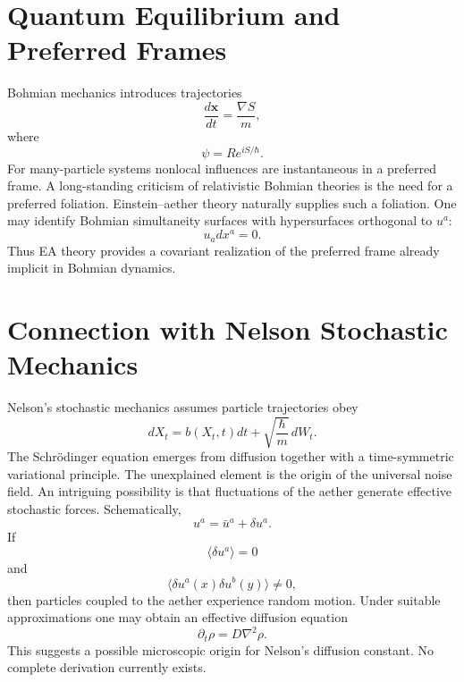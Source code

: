 \documentclass[11pt]{article}
\begin{document}
\section{Quantum Equilibrium and Preferred Frames}
Bohmian mechanics introduces trajectories
\begin{equation}
\frac{d\mathbf{x}}{dt}
=
\frac{\nabla S}{m},
\end{equation}
where
\begin{equation}
\psi=R e^{iS/\hbar}.
\end{equation}
For many-particle systems nonlocal influences are instantaneous in a
preferred frame.
A long-standing criticism of relativistic Bohmian theories is the need
for a preferred foliation.
Einstein--aether theory naturally supplies such a foliation.
One may identify Bohmian simultaneity surfaces with hypersurfaces
orthogonal to $u^a$:
\begin{equation}
u_a dx^a =0.
\end{equation}
Thus EA theory provides a covariant realization of the preferred frame
already implicit in Bohmian dynamics.
\section{Connection with Nelson Stochastic Mechanics}
Nelson's stochastic mechanics assumes particle trajectories obey
\begin{equation}
dX_t=b(X_t,t)dt+\sqrt{\frac{\hbar}{m}}\,dW_t.
\end{equation}
The Schr\"odinger equation emerges from diffusion together with a
time-symmetric variational principle.
The unexplained element is the origin of the universal noise field.
An intriguing possibility is that fluctuations of the aether generate
effective stochastic forces.
Schematically,
\begin{equation}
u^a
=
\bar u^a + \delta u^a .
\end{equation}
If
\begin{equation}
\langle \delta u^a \rangle =0
\end{equation}
and
\begin{equation}
\langle
\delta u^a(x)
\delta u^b(y)
\rangle
\neq 0,
\end{equation}
then particles coupled to the aether experience random motion.
Under suitable approximations one may obtain an effective diffusion
equation
\begin{equation}
\partial_t \rho
=
D\nabla^2\rho.
\end{equation}
This suggests a possible microscopic origin for Nelson's diffusion
constant.
No complete derivation currently exists.
\end{document}

